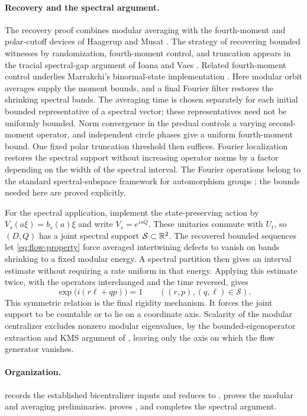 \paragraph{Recovery and the spectral argument.}
The recovery proof combines modular averaging with the fourth-moment
and polar-cutoff devices of Haagerup and Musat
\cite[Equation~(2.10), Lemma~2.6, and Remark~2.8]{HaagerupMusat2007}.
The strategy of recovering bounded witnesses by randomization,
fourth-moment control, and truncation appears in the tracial spectral-gap
argument of Ioana and Vaes \cite[pp.~127--130]{IoanaVaes2015}.
Related fourth-moment control underlies Marrakchi's binormal-state
implementation \cite[Section~2, Claim~2.2]{Marrakchi2025}.
Here modular orbit averages supply the moment bounds, and a final Fourier
filter restores the shrinking spectral bands.
The averaging time is chosen separately for each initial bounded
representative of a spectral vector; these representatives need not be
uniformly bounded.
Norm convergence in the predual controls a varying second-moment
operator, and independent circle phases give a uniform fourth-moment
bound. One fixed polar truncation threshold then suffices. Fourier
localization restores the spectral support without increasing operator
norms by a factor depending on the width of the spectral interval.
The Fourier operations belong to the standard spectral-subspace
framework for automorphism groups \cite{Arveson1974}; the bounds needed
here are proved explicitly.

For the spectral application, implement the state-preserving action by
$V_s(a\xi)=b_s(a)\xi$ and write $V_s=e^{isQ}$. These unitaries commute
with $U_t$, so $(D,Q)$ has a joint spectral support $\mathcal S\subset\mathbb R^2$.
The recovered bounded sequences let \eqref{eq:flow-property} force
averaged intertwining defects to vanish on bands shrinking to a fixed
modular energy. A spectral partition then gives an interval estimate
without requiring a rate uniform in that energy. Applying this estimate
twice, with the operators interchanged and the time reversed, gives
\[
  \exp\bigl(i(r\ell+qp)\bigr)=1
  \qquad ((r,p),(q,\ell)\in\mathcal S).
\]
This symmetric relation is the final rigidity mechanism. It forces the
joint support to be countable or to lie on a coordinate axis.
Scalarity of the modular centralizer excludes nonzero modular
eigenvalues, by the bounded-eigenoperator extraction and KMS argument of
\cite[Lemma~2.1]{MarrakchiVaes2024}, leaving only the axis on which the
flow generator vanishes.

\paragraph{Organization.}
 records the established bicentralizer inputs
and reduces  to .
 proves the modular and averaging preliminaries.
 proves , and
 completes the spectral argument.
